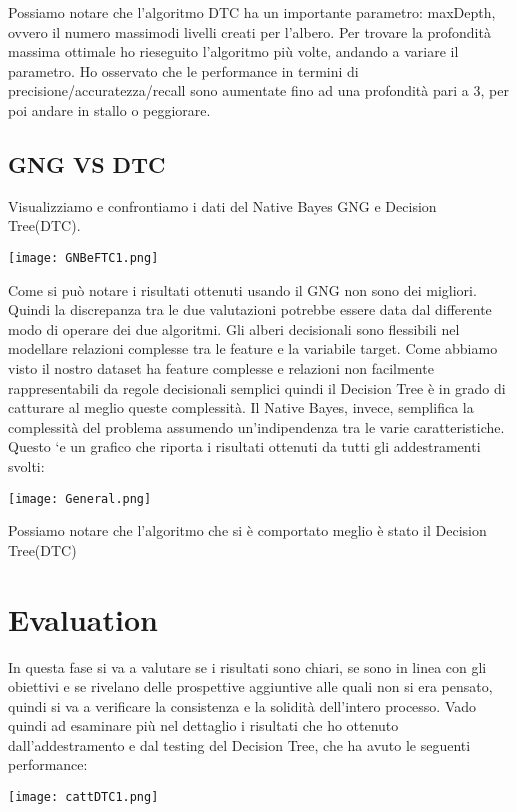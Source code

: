 \documentclass{article}
\begin{document}
Possiamo notare che l’algoritmo DTC ha un importante parametro: maxDepth, ovvero il numero massimodi livelli creati per l’albero. Per trovare la profondità massima ottimale ho rieseguito l’algoritmo più volte, andando a variare il parametro. Ho osservato che le performance in termini di precisione/accuratezza/recall sono aumentate fino ad una profondità pari a 3, per poi andare in stallo o peggiorare.


\subsection{GNG VS DTC}

Visualizziamo e confrontiamo i dati del Native Bayes GNG e Decision Tree(DTC).
\begin{center}
  \texttt{[image: GNBeFTC1.png]}
\end{center}

Come si può notare i risultati ottenuti usando il GNG non sono dei migliori. Quindi la discrepanza tra le due valutazioni potrebbe essere data dal differente modo di operare dei due algoritmi. Gli alberi decisionali sono flessibili nel modellare relazioni complesse tra le feature e la variabile target. Come abbiamo visto  il nostro dataset ha feature complesse e relazioni non facilmente rappresentabili da regole decisionali semplici quindi il Decision Tree è in grado di catturare al meglio queste complessità. Il Native Bayes, invece, semplifica la complessità del problema assumendo un'indipendenza tra le varie caratteristiche. Questo `e un grafico che riporta i risultati ottenuti da tutti gli addestramenti
svolti:
\begin{center}
  \texttt{[image: General.png]}
\end{center}

Possiamo notare che l'algoritmo che si è comportato meglio è stato il Decision Tree(DTC)

\newpage
\section{Evaluation}
In questa fase si va a valutare se i risultati sono chiari, se sono in linea con gli obiettivi e se rivelano
delle prospettive aggiuntive alle quali non si era pensato, quindi si va a verificare la consistenza e la
solidità dell’intero processo. Vado quindi ad esaminare più nel dettaglio i risultati che ho ottenuto dall’addestramento e dal testing del Decision Tree, che ha avuto le seguenti performance:
\begin{center}
  \texttt{[image: cattDTC1.png]}
\end{center}
\end{document}
